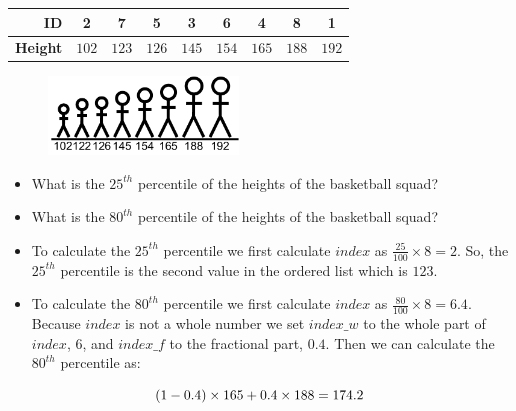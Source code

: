 \documentclass[xcolor={table}]{beamer}
\begin{document}
 \begin{frame} 
 \begin{example} 
 \begin{table}
\label{table:BasketballTeamHeights2Ordered}
\centering
\begin{footnotesize}
\begin{tabular}{ r |  c c c c c c c c }
\textbf{ID} & 2 & 7 & 5 & 3  & 6 & 4 & 8 & 1 \\
\hline
\textbf{Height} & $102$ & $123$ & $126$ & $145$ & $154$ & $165$ & $188$ & $192$ \\
\end{tabular}
\end{footnotesize}
\end{table}
 \begin{figure}
\centering
\includegraphics[width=0.45\textwidth]{./images/DataEx-DesriptiveStatsPuppetShowTeam2OrderedPlusHeights.pdf}
\label{fig:descriptiveStatsTeam2Ordered}
\end{figure}
\begin{itemize}
\item What is the $25^{th}$ percentile of the heights of the basketball squad?
\item What is the $80^{th}$ percentile of the heights of the basketball squad?
\end{itemize}
\end{example}
\end{frame} 


 \begin{frame}  
 \begin{example}
\begin{itemize}
\item To calculate the $25^{th}$ percentile we first calculate $index$ as $\frac{25}{100}\times8 = 2$. So, the $25^{th}$ percentile is the second value in the ordered list which is $123$. 
\item To calculate the $80^{th}$ percentile we first calculate $index$ as $\frac{80}{100}\times8 = 6.4$. Because $index$ is not a whole number we set $index\_w$ to the whole part of $index$, $6$, and $index\_f$ to the fractional part, $0.4$. Then we can calculate the $80^{th}$ percentile as:
\end{itemize}
\begin{equation*}\centering
(1 - 0.4) \times 165 + 0.4 \times 188 = 174.2
\end{equation*}
\end{example}
\end{frame} 
\end{document}
